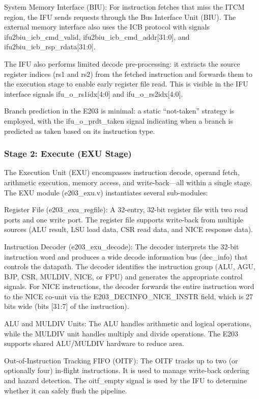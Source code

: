 System Memory Interface (BIU): For instruction fetches that miss the ITCM region, the IFU sends requests through the Bus Interface Unit (BIU). The external memory interface also uses the ICB protocol with signals ifu2biu\_icb\_cmd\_valid, ifu2biu\_icb\_cmd\_addr[31:0], and ifu2biu\_icb\_rsp\_rdata[31:0].


The IFU also performs limited decode pre-processing: it extracts the source register indices (rs1 and rs2) from the fetched instruction and forwards them to the execution stage to enable early register file read. This is visible in the IFU interface signals ifu\_o\_rs1idx[4:0] and ifu\_o\_rs2idx[4:0].


Branch prediction in the E203 is minimal: a static “not-taken” strategy is employed, with the ifu\_o\_prdt\_taken signal indicating when a branch is predicted as taken based on its instruction type.


\subsubsection{Stage 2: Execute (EXU Stage)}

The Execution Unit (EXU) encompasses instruction decode, operand fetch, arithmetic execution, memory access, and write-back—all within a single stage. The EXU module (e203\_exu.v) instantiates several sub-modules:


Register File (e203\_exu\_regfile): A 32-entry, 32-bit register file with two read ports and one write port. The register file supports write-back from multiple sources (ALU result, LSU load data, CSR read data, and NICE response data).


Instruction Decoder (e203\_exu\_decode): The decoder interprets the 32-bit instruction word and produces a wide decode information bus (dec\_info) that controls the datapath. The decoder identifies the instruction group (ALU, AGU, BJP, CSR, MULDIV, NICE, or FPU) and generates the appropriate control signals. For NICE instructions, the decoder forwards the entire instruction word to the NICE co-unit via the E203\_DECINFO\_NICE\_INSTR field, which is 27 bits wide (bits [31:7] of the instruction).


ALU and MULDIV Units: The ALU handles arithmetic and logical operations, while the MULDIV unit handles multiply and divide operations. The E203 supports shared ALU/MULDIV hardware to reduce area.


Out-of-Instruction Tracking FIFO (OITF): The OITF tracks up to two (or optionally four) in-flight instructions. It is used to manage write-back ordering and hazard detection. The oitf\_empty signal is used by the IFU to determine whether it can safely flush the pipeline.



